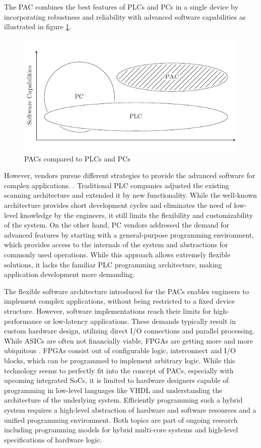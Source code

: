 The \ac{PAC} combines the best features of \acp{PLC} and \acp{PC} in a single
device by incorporating robustness and reliability with advanced software
capabilities as illustrated in figure \ref{fig:pac}.
\begin{figure}[tb]
	\centering
	\includegraphics{../figures/pac}
	\caption{\acsp{PAC} compared to \acsp{PLC} and \acsp{PC} \citep[adapted from][]{bel05}}
	\label{fig:pac}
\end{figure}
However, vendors pursue different strategies to provide the advanced software
for complex applications. \citep{bel05}. Traditional \ac{PLC} companies
adjusted the existing scanning architecture and extended it by new
functionality. While the well-known architecture provides short development
cycles and eliminates the need of low-level knowledge by the engineers, it
still limits the flexibility and customizability of the system. On the other
hand, \ac{PC} vendors addressed the demand for advanced features by starting
with a general-purpose programming environment, which provides access to the
internals of the system and abstractions for commonly used operations. While
this approach allows extremely flexible solutions, it lacks the familiar
\ac{PLC} programming architecture, making application development more
demanding.

The flexible software architecture introduced for the \acp{PAC} enables
engineers to implement complex applications, without being restricted to a
fixed device structure. However, software implementations reach their limits
for high-performance or low-latency applications. These demands typically
result in custom hardware design, utilizing direct I/O connections and
parallel processing. While \acp{ASIC} are often not financially viable,
\acp{FPGA} are getting more and more ubiquitous \citep{VMB13}. \acp{FPGA}
consist out of configurable logic, interconnect and I/O blocks, which can be
programmed to implement arbitrary logic. While this technology seems to
perfectly fit into the concept of \acp{PAC}, especially with upcoming
integrated \acp{SoC}, it is limited to hardware designers capable of
programming in low-level languages like \ac{VHDL} and understanding the
architecture of the underlying system. Efficiently programming such a hybrid
system requires a high-level abstraction of hardware and software resources
\citep{ANA04} and a unified programming environment. Both topics are part of
ongoing research including programming models for hybrid multi-core systems
and high-level specifications of hardware logic.


